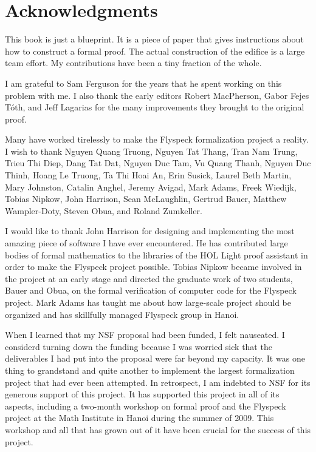 

\section*{Acknowledgments}

This book is just a blueprint.  It is a piece of paper that gives instructions
about how to construct a formal proof.  The actual construction of the edifice
is a large team effort.  My contributions have been a tiny fraction of the whole.

I am grateful to Sam Ferguson for the years that
he spent working on this problem with me.  I also thank the early editors
Robert MacPherson, Gabor Fejes T\'oth, and Jeff Lagarias for the many improvements
they brought to the original proof.

Many have worked tirelessly to make the Flyspeck formalization project
a reality.  I wish to thank Nguyen Quang
Truong, %
Nguyen Tat Thang, %
Tran Nam Trung, Trieu Thi Diep, Dang Tat Dat, Nguyen Duc Tam, Vu Quang
Thanh, Nguyen Duc Thinh, Hoang Le Truong, Ta Thi Hoai An, Erin Susick,
Laurel Beth Martin, Mary Johnston, Catalin Anghel, Jeremy Avigad,
Mark Adams, Freek Wiedijk, Tobias Nipkow, John Harrison, Sean
McLaughlin, Gertrud Bauer, Matthew Wampler-Doty, Steven Obua, and
Roland Zumkeller.

 I would like to thank John Harrison for designing and implementing the most amazing piece of
 software I have ever encountered.  He has contributed large bodies of formal mathematics to
the libraries of the HOL Light proof assistant in order to make the Flyspeck project
possible.   Tobias Nipkow became involved in the project at an early stage and
directed the graduate work of two students, Bauer and Obua, on the formal verification of computer
code for the Flyspeck project. Mark Adams has taught me about how
 large-scale project should be organized and has skillfully managed 
  Flyspeck group in Hanoi.

  When I learned that my NSF proposal had been funded, I felt
  nauseated.  I considerd turning down the
  funding because I was  worried sick that the  deliverables I had put
  into the proposal were far beyond my capacity.  It was one thing to
  grandstand and quite another to implement the largest
  formalization project that had ever been attempted.  In retrospect, I
  am indebted to NSF for its generous support of this project.  It has supported
  this project in all of its aspects, including a
  two-month  workshop on formal proof
  and the Flyspeck project  at the Math Institute in Hanoi during the summer of
  2009.  This workshop and all that has grown out of it have been crucial for
  the success of this project.

